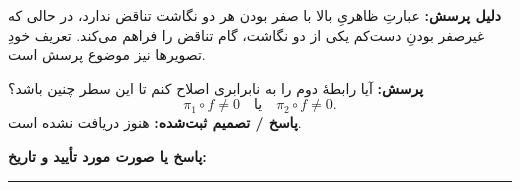 \documentclass[a4paper,12pt]{article}
\newcommand{\answer}{\par\medskip\textbf{پاسخ یا صورت مورد تأیید و تاریخ:}\par\vspace{18mm}\hrule\medskip}
\begin{document}
\textbf{دلیل پرسش:} عبارتِ ظاهریِ بالا با صفر بودن هر دو نگاشت تناقض ندارد، در حالی که غیرصفر بودنِ دست‌کم یکی از دو نگاشت، گام تناقض را فراهم می‌کند. تعریف خودِ تصویرها نیز موضوع پرسش  است.

\textbf{پرسش:} آیا رابطهٔ دوم را به نابرابری اصلاح کنم تا این سطر چنین باشد؟
\[
\pi_1\circ f\ne0\quad\text{یا}\quad\pi_2\circ f\ne0.
\]
\textbf{پاسخ / تصمیم ثبت‌شده:} هنوز دریافت نشده است.
\answer
\end{document}
